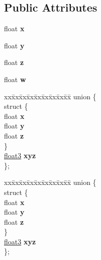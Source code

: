 \subsection*{Public Attributes}
\begin{DoxyCompactItemize}
\item 
\mbox{\label{structfloat4_ab60e7164162636ef8d0315cf18269b0f}} 
float {\bfseries x}
\item 
\mbox{\label{structfloat4_a72bce4984c96cef3d6a50adcbce6e388}} 
float {\bfseries y}
\item 
\mbox{\label{structfloat4_a898443ac0132ee9f149661c63882361b}} 
float {\bfseries z}
\item 
\mbox{\label{structfloat4_ae3ef7af10eec7945566a363866321e26}} 
float {\bfseries w}
\item 
\mbox{\label{structfloat4_a240a47c12cb5396c10f489f9242501aa}} 
\begin{tabbing}
xx\=xx\=xx\=xx\=xx\=xx\=xx\=xx\=xx\=\kill
union \{\\
\mbox{\label{unionfloat4_1_1_0D75_a0ad08172f5989bb905351540ef951133}} 
\>struct \{\\
\>\>float {\bfseries x}\\
\>\>float {\bfseries y}\\
\>\>float {\bfseries z}\\
\>\} \\
\>\hyperlink{structfloat3}{float3} {\bfseries xyz}\\
\}; \\

\end{tabbing}\item 
\mbox{\label{structfloat4_a172dccf3b522bd9d66a377db74295f79}} 
\begin{tabbing}
xx\=xx\=xx\=xx\=xx\=xx\=xx\=xx\=xx\=\kill
union \{\\
\mbox{\label{unionfloat4_1_1_0D277_a8808dbcf09232bdba4c5c1e7ceb86192}} 
\>struct \{\\
\>\>float {\bfseries x}\\
\>\>float {\bfseries y}\\
\>\>float {\bfseries z}\\
\>\} \\
\>\hyperlink{structfloat3}{float3} {\bfseries xyz}\\
\}; \\

\end{tabbing}\end{DoxyCompactItemize}


